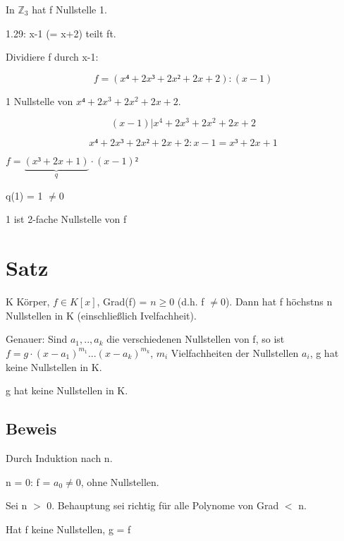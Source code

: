 \documentclass[a4paper, openany]{book}
\begin{document}
    In $\mathbb{Z}_{3}$ hat f Nullstelle 1.

    1.29: x-1 (= x+2) teilt ft.

    Dividiere f durch x-1: 

    \begin{equation}
      f = (x⁴ + 2x³ +2x² + 2x +2) : (x-1)
    \end{equation}

    1 Nullstelle von $x⁴ + 2x^3 + 2x^2 + 2x + 2$.

    \begin{equation}
      (x-1)|x^4 + 2x^3 + 2x^2 + 2x +2
    \end{equation}

    \begin{equation}
      x⁴ + 2x³ + 2x² + 2x + 2 : x-1 = x³ + 2x+1
    \end{equation}

    $f = \underbrace{(x³ + 2x + 1)}_{q}  \cdot (x-1)²$

    q(1) = 1 $\neq 0$

    1 ist 2-fache Nullstelle von f

    \section{Satz}

    K Körper, $f \in K[x]$, Grad(f) = $n \geq 0 $ (d.h. f $\neq 0$). Dann hat f höchstns n Nullstellen in K (einschließlich Ivelfachheit).

    Genauer: Sind $a_1,..,a_k$ die verschiedenen Nullstellen von f, so ist $f = g \cdot (x-a_1)^{m_1} ... (x-a_k)^{m_k}$, $m_i$ Vielfachheiten der Nullstellen $a_i$, g hat keine Nullstellen in K.

    g hat keine Nullstellen in K.

    \subsection{Beweis}

    Durch Induktion nach n.

    \par \medskip

    n = 0: f = $a_0 \neq 0$, ohne Nullstellen.

    \par \medskip

    Sei n $>$ 0. Behauptung sei richtig für alle Polynome von Grad $<$ n.

    Hat f keine Nullstellen, g = f
\end{document}
